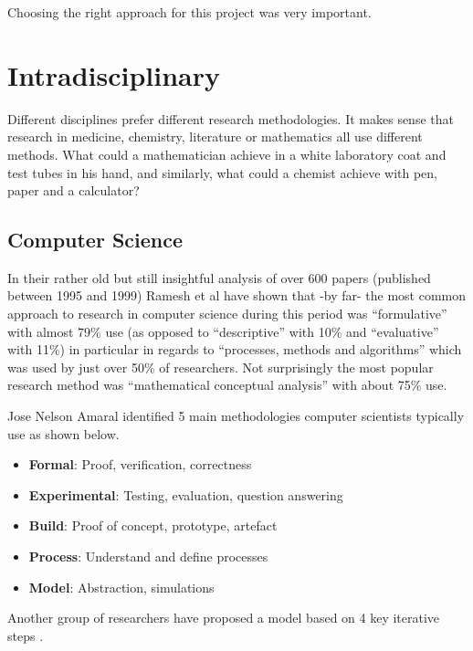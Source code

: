 Choosing the right approach for this project was very important.



\section{Intradisciplinary}

Different disciplines prefer different research methodologies. It makes sense that research in medicine, chemistry, literature or mathematics all use different methods. What could a mathematician achieve in a white laboratory coat and test tubes in his hand, and similarly, what could a chemist achieve with pen, paper and a calculator?


\subsection{Computer Science}

In their rather old but still insightful analysis of over 600 papers (published between 1995 and 1999) Ramesh et al \autocite{Ramesh2004} have shown that -by far- the most common approach to research in computer science during this period was ``formulative'' with almost 79\% use (as opposed to ``descriptive'' with 10\% and ``evaluative'' with 11\%) in particular in regards to ``processes, methods and algorithms'' which was used by just over 50\% of researchers. Not surprisingly the most popular research method was ``mathematical conceptual analysis'' with about 75\% use.

Jose Nelson Amaral identified 5 main methodologies computer scientists typically use \autocite{Amaral} as shown below.

\begin{itemize}
  \item \textbf{Formal}: Proof, verification, correctness
  \item \textbf{Experimental}: Testing, evaluation, question answering
  \item \textbf{Build}: Proof of concept, prototype, artefact
  \item \textbf{Process}: Understand and define processes
  \item \textbf{Model}: Abstraction, simulations
\end{itemize}

Another group of researchers have proposed a model based on 4 key iterative steps \autocite{Holz2006}.

